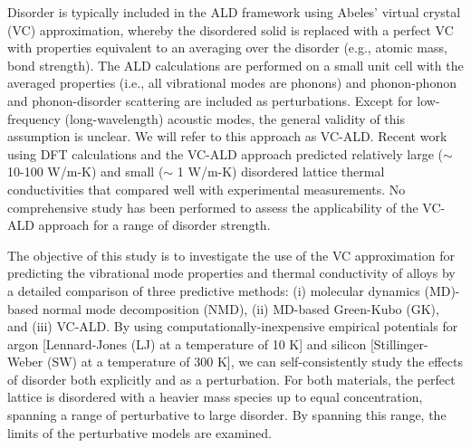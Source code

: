 \documentclass[aps,prb,onecolumn,preprint,footinbib,superscriptaddress,amsmath,amssymb,floatfix]{revtex4}
\begin{document}
Disorder is typically included in the ALD framework using Abeles' 
virtual crystal (VC) approximation, whereby the disordered  
solid is replaced with a perfect VC with properties 
equivalent to an averaging over the disorder 
(e.g., atomic mass, bond strength).\cite{abeles_lattice_1963}
The ALD calculations are performed on a small 
unit cell with the averaged properties 
(i.e., all vibrational modes are phonons) and 
phonon-phonon and phonon-disorder scattering 
are included as perturbations.
\cite{abeles_lattice_1963,tamura_isotope_1983,
tian_phonon_2012,lindsay_thermal_2012} 
Except for low-frequency (long-wavelength) acoustic modes,
the general validity of this assumption is unclear. 
We will refer to this approach as VC-ALD. 
Recent work using DFT calculations and the VC-ALD approach 
predicted relatively large ($\sim$ 10-100 W/m-K)
\cite{garg_role_2011,lindsay_thermal_2012,li_thermal_2012} and 
small ($\sim$ 1 W/m-K)\cite{tian_phonon_2012} 
disordered lattice thermal conductivities that compared well with 
experimental measurements. No comprehensive study has been performed 
to assess the applicability of the VC-ALD approach for a range 
of disorder strength.

The objective of this study is to investigate the use of the VC 
approximation for predicting the vibrational mode properties and 
thermal conductivity of alloys by a detailed comparison 
of three predictive methods: (i) molecular dynamics (MD)-based 
normal mode decomposition (NMD), (ii) MD-based Green-Kubo (GK), 
and (iii) VC-ALD. By using computationally-inexpensive  
empirical potentials for argon [Lennard-Jones (LJ) at a temperature of 10 K]
\cite{ashcroft_solid_1976} 
and silicon [Stillinger-Weber (SW) at a temperature of 300 K],
\cite{stillinger_computer_1985}   
we can self-consistently study the effects of disorder both explicitly 
and as a perturbation. For both materials, the perfect lattice is 
disordered with a heavier mass species up to equal 
concentration, spanning 
a range of perturbative to large disorder. By spanning this range, 
the limits of the perturbative models are examined.
\end{document}
